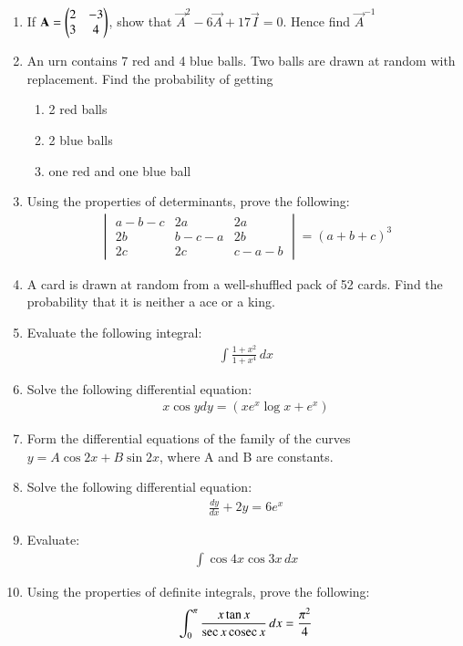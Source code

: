 \documentclass[journal,12pt,twocolumn]{IEEEtran}
\begin{document}
\begin{enumerate}
\item If $\mathbf{A} =\begin{pmatrix}2&-3\\3&4\end{pmatrix}$, show that $\vec{A}^2 - 6\vec{A} + 17\vec{I} = 0$. Hence find $\vec{A}^{-1}$
\item An urn contains 7 red and 4 blue balls. Two balls are drawn at random with replacement. Find the probability of getting
\begin{enumerate}
\item 2 red balls
\item 2 blue balls
\item one red and one blue ball
\end{enumerate} 
\item Using the properties of determinants, prove the following:
\begin{align}
\begin{vmatrix}
a-b-c & 2a& 2a\\ 2b& b-c-a& 2b\\2c&2c&c-a-b 
\end{vmatrix}
= (a+b+c)^3 \nonumber
\end{align}
\item A card is drawn at random from a well-shuffled pack of 52 cards. Find the probability that it is neither a ace or a king.
\item Evaluate the following integral:
\begin{align}
 \int \displaystyle\frac{1+x^2}{1+x^4}\,dx \nonumber
\end{align}
\item Solve the following differential equation:
\begin{align}
x \cos y dy=(xe^x\log x + e^x) \nonumber
\end{align}
\item Form the differential equations of the family of the curves $y = A\cos 2x + B\sin 2x$, where A and B are constants.
\item Solve the following differential equation:
\begin{align}
   \displaystyle\frac{dy}{dx} + 2y = 6e^x \nonumber
\end{align}
\item Evaluate:
\begin{align}
   \int \cos 4x\cos 3x\, dx 
\end{align}
\item Using the properties of definite integrals, prove the following:
\begin{align}
 \int_{0}^{\pi} \displaystyle\frac{x\tan x}{\sec x\cosec x}\, dx = \displaystyle\frac{\pi^2}{4} \nonumber

\end{align}
\end{enumerate}
\end{document}

